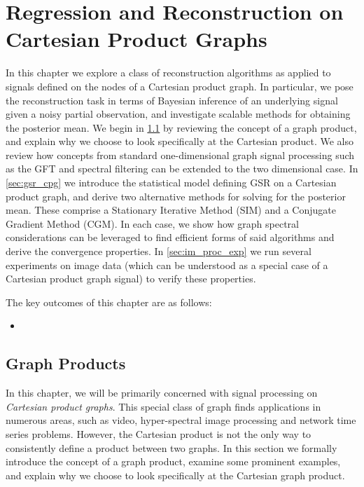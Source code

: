 \chapter{Regression and Reconstruction on Cartesian Product Graphs}

\label{chap:reg_and_rec}



In this chapter we explore a class of reconstruction algorithms as applied to signals defined on the nodes of a Cartesian product graph. In particular, we pose the reconstruction task in terms of Bayesian inference of an underlying signal given a noisy partial observation, and investigate scalable methods for obtaining the posterior mean. We begin in \cref{sec:reg_and_rec_intro} by reviewing the concept of a graph product, and explain why we choose to look specifically at the Cartesian product. We also review how concepts from standard one-dimensional graph signal processing such as the GFT and spectral filtering can be extended to the two dimensional case. In \cref{sec:gsr_cpg} we introduce the statistical model defining GSR on a Cartesian product graph, and derive two alternative methods for solving for the posterior mean. These comprise a Stationary Iterative Method (SIM) and a Conjugate Gradient Method (CGM). In each case, we show how graph spectral considerations can be leveraged to find efficient forms of said algorithms and derive the convergence properties. In \cref{sec:im_proc_exp} we run several experiments on image data (which can be understood as a special case of a Cartesian product graph signal) to verify these properties. 

The key outcomes of this chapter are as follows:

\begin{itemize}
    \item 
\end{itemize}



\section{Graph Products}

\label{sec:reg_and_rec_intro}

In this chapter, we will be primarily concerned with signal processing on \textit{Cartesian product graphs}. This special class of graph finds applications in numerous areas, such as video, hyper-spectral image processing and network time series problems. However, the Cartesian product is not the only way to consistently define a product between two graphs. In this section we formally introduce the concept of a graph product, examine  some prominent examples, and explain why we choose to look specifically at the Cartesian graph product.

